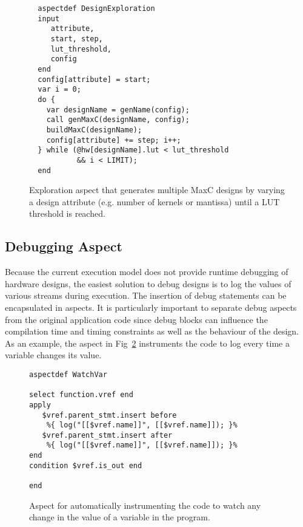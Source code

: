 \lstset{style=lara}
\begin{figure}[!h]
\begin{lstlisting}
  aspectdef DesignExploration
  input
     attribute,
     start, step,
     lut_threshold,
     config
  end
  config[attribute] = start; 
  var i = 0;
  do {        
    var designName = genName(config);
    call genMaxC(designName, config);
    buildMaxC(designName);
    config[attribute] += step; i++;
  } while (@hw[designName].lut < lut_threshold 
           && i < LIMIT);
  end
\end{lstlisting}
\caption{Exploration aspect that generates multiple MaxC designs by varying a design attribute (e.g. number of kernels or mantissa) until a LUT threshold is reached.}
\label{fig:aspect-exploration}
\end{figure}


\subsection{Debugging Aspect}
\label{sect:asp_debug}
Because the current execution model does not provide runtime debugging
of hardware designs, the easiest solution to debug designs is to log
the values of various streams during execution. The insertion of debug
statements can be encapsulated in aspects. It is particularly
important to separate debug aspects from the original application code
since debug blocks can influence the compilation time and timing
constraints as well as the behaviour of the design. As an example,
the aspect in Fig~\ref{fig:aspect-debug} instruments the code to log every time a variable changes its value.

\lstset{style=lara}
\begin{figure}[!h]
  \centering
\begin{lstlisting}
aspectdef WatchVar

select function.vref end
apply
   $vref.parent_stmt.insert before
    %{ log("[[$vref.name]]", [[$vref.name]]); }%
   $vref.parent_stmt.insert after
    %{ log("[[$vref.name]]", [[$vref.name]]); }%
end
condition $vref.is_out end

end
\end{lstlisting}
  \caption{Aspect for automatically instrumenting the code to watch any change in the value of a  variable in the program.}
  \label{fig:aspect-debug}
\end{figure}
